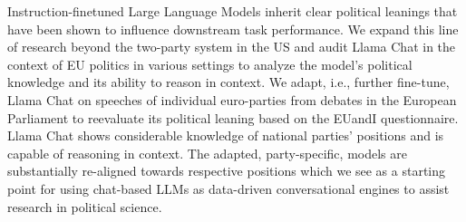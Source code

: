 Instruction-finetuned Large Language Models inherit clear political leanings that have been shown to influence downstream task performance. We expand this line of research beyond the two-party system in the US and audit Llama Chat in the context of EU politics in various settings to analyze the model's political knowledge and its ability to reason in context. We adapt, i.e., further fine-tune, Llama Chat on speeches of individual euro-parties from debates in the European Parliament to reevaluate its political leaning based on the EUandI questionnaire. Llama Chat shows considerable knowledge of national parties' positions and is capable of reasoning in context. The adapted, party-specific, models are substantially re-aligned towards respective positions which we see as a starting point for using chat-based LLMs as data-driven conversational engines to assist research in political science.